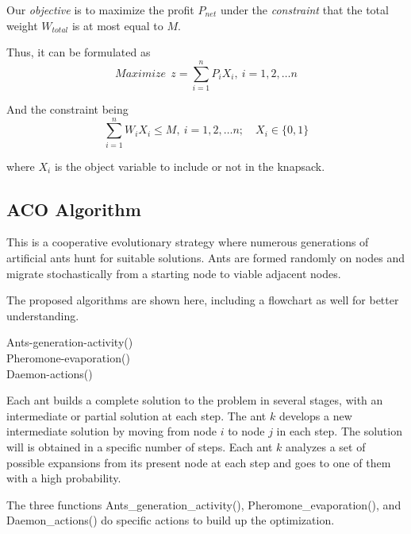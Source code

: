 \documentclass[conference]{IEEEtran}
\begin{document}
Our \textit{objective} is to maximize the profit $P_{net}$ under the \textit{constraint} that the total weight $W_{total}$ is at most equal to $M$.

\par
Thus, it can be formulated as
\[Maximize\:\: z= \sum_{i=1}^{n} P_iX_i, \: i = 1,2, \dotso n\]

And the constraint being
\[\sum_{i=1}^{n} W_iX_i \leq M, \: i = 1,2, \dotso n;\quad X_i \in \{0,1\}\]

where $X_i$ is the object variable to include or not in the knapsack.

\subsection{ACO Algorithm}
This is a cooperative evolutionary strategy where numerous generations of artificial ants hunt for suitable solutions. Ants are formed randomly on nodes and migrate stochastically from a starting node to viable adjacent nodes.


\par
The proposed algorithms are shown here, including a flowchart as well for better understanding.
\begin{algorithm}
	 {Ants-generation-activity() \\	 Pheromone-evaporation() \\ Daemon-actions()}
\end{algorithm}

Each ant builds a complete solution to the problem in several stages, with an intermediate or partial solution at each step. The ant $k$ develops a new intermediate solution by moving from node $i$ to node $j$ in each step. The solution will is obtained in a specific number of steps. Each ant $k$ analyzes a set of possible expansions from its present node at each step and goes to one of them with a high probability.\par

The three functions Ants\_generation\_activity(), Pheromone\_evaporation(), and Daemon\_actions() do specific actions to build up the optimization.
\end{document}
